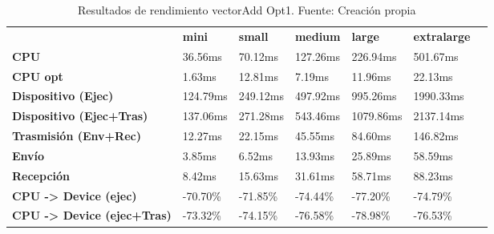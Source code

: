 \begin{table}[H]
    \centering
    \begin{tabular}{lllllll}
    \rowcolor[HTML]{DAE8FC} \ &  \textbf{mini} &  \textbf{small} &  \textbf{medium} &  \textbf{	large} &  \textbf{	extralarge} \\
    \cellcolor[HTML]{DAE8FC} \textbf{CPU} & 36.56ms & 70.12ms & 127.26ms & 	226.94ms & 	501.67ms \\
    \rowcolor[HTML]{EFEFEF} \cellcolor[HTML]{DAE8FC} \textbf{CPU opt} & 1.63ms & 12.81ms & 7.19ms & 	11.96ms & 	22.13ms \\
    \cellcolor[HTML]{DAE8FC} \textbf{Dispositivo (Ejec)} & 124.79ms & 249.12ms & 497.92ms & 	995.26ms & 	1990.33ms \\
    \rowcolor[HTML]{EFEFEF} \cellcolor[HTML]{DAE8FC} \textbf{Dispositivo (Ejec+Tras)} & 137.06ms & 271.28ms & 543.46ms & 	1079.86ms & 	2137.14ms \\
    \cellcolor[HTML]{DAE8FC} \textbf{Trasmisión (Env+Rec)} & 12.27ms & 22.15ms & 45.55ms & 	84.60ms & 	146.82ms \\
    \rowcolor[HTML]{EFEFEF} \cellcolor[HTML]{DAE8FC} \textbf{Envío} & 3.85ms & 6.52ms & 13.93ms & 	25.89ms & 	58.59ms \\
    \cellcolor[HTML]{DAE8FC} \textbf{Recepción} & 8.42ms & 15.63ms & 31.61ms & 	58.71ms & 	88.23ms \\
    \rowcolor[HTML]{EFEFEF} \cellcolor[HTML]{DAE8FC} \textbf{CPU -> Device (ejec)} & -70.70\% & -71.85\% & -74.44\% & 	-77.20\% & 	-74.79\% \\
    \cellcolor[HTML]{DAE8FC} \textbf{CPU -> Device (ejec+Tras)} & -73.32\% & -74.15\% & -76.58\% & 	-78.98\% & 	-76.53\% \\
    \end{tabular}
    \caption[Resultados de rendimiento vectorAdd Opt1]{{Resultados de rendimiento vectorAdd Opt1. Fuente: Creación propia}}
    \label{table_test_vectorAdd_Opt1_hw_performanceResults}
\end{table}
